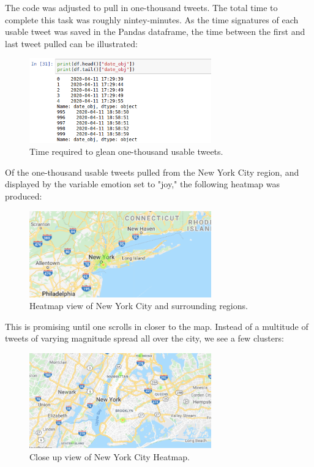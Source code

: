 \documentclass[12pt, oneside]{article}
\begin{document}
The code was adjusted to pull in one-thousand tweets. The total time to
complete this task was roughly nintey-minutes. As the time signatures of each
usable tweet was saved in the Pandas dataframe, the time between the
first and last tweet pulled can be illustrated:

\begin{figure}[H]
\centering
\includegraphics[width=0.7\textwidth]{time}
  \caption{Time required to glean one-thousand usable tweets.}
\end{figure}


Of the one-thousand usable tweets pulled from the New York City region, and
displayed by the variable emotion set to "joy," the following heatmap was
produced:

\begin{figure}[H]
\centering
\includegraphics[width=0.7\textwidth]{nyClose}
  \caption{Heatmap view of New York City and surrounding regions.}
  \label{fig:ny1}
\end{figure}

This is promising until one scrolls in closer to the map. Instead of a
multitude of tweets of varying magnitude spread all over the city, we see a few
clusters:

\begin{figure}[H]
\centering
\includegraphics[width=0.7\textwidth]{NyBoroughs}
  \caption{Close up view of New York City Heatmap.}
  \label{fig:ny2}
\end{figure}
\end{document}
